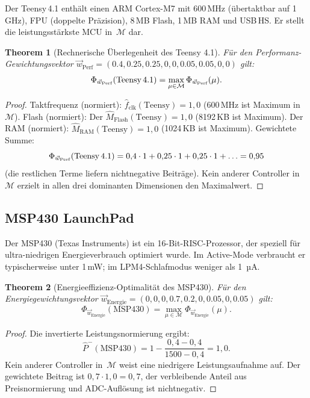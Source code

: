 ﻿\documentclass[12pt, a4paper]{article}
\theoremstyle{plain}
\newtheorem{theorem}{Theorem}[section]
\theoremstyle{definition}
\theoremstyle{remark}
\begin{document}
Der Teensy\,4.1 enthält einen ARM Cortex-M7 mit 600\,MHz (übertaktbar auf
1\,GHz), FPU (doppelte Präzision), 8\,MB Flash, 1\,MB RAM und USB\,HS.
Er stellt die leistungsstärkste MCU in~$\mathcal{M}$ dar.

\begin{theorem}[Rechnerische Überlegenheit des Teensy 4.1]
\label{thm:teensy_superior}
  Für den Performanz-Ge\-wichtungsvektor
  $\vec{w}_\text{Perf} = (0.4, 0.25, 0.25, 0, 0, 0.05, 0.05, 0, 0)$
  gilt:
  \[
    \Phi_{\vec{w}_\text{Perf}}(\text{Teensy\,4.1}) =
    \max_{\mu \in \mathcal{M}} \Phi_{\vec{w}_\text{Perf}}(\mu).
  \]
\end{theorem}

\begin{proof}
  Taktfrequenz (normiert): $\hat{f}_\text{clk}(\text{Teensy}) = 1{,}0$
  (600\,MHz ist Maximum in~$\mathcal{M}$).
  Flash (normiert): Der $\hat{M}_\text{Flash}(\text{Teensy}) = 1{,}0$
  (8192\,KB ist Maximum).
  Der RAM (normiert): $\hat{M}_\text{RAM}(\text{Teensy}) = 1{,}0$
  (1024\,KB ist Maximum).
  Gewichtete Summe:
  \[
    \Phi_{\vec{w}_\text{Perf}}(\text{Teensy\,4.1}) =
    0{,}4 \cdot 1 + 0{,}25 \cdot 1 + 0{,}25 \cdot 1 + \ldots = 0{,}95
  \]
  (die restlichen Terme liefern nichtnegative Beiträge).
  Kein anderer Controller in~$\mathcal{M}$ erzielt in allen drei
  dominanten Dimensionen den Maximalwert.
\end{proof}

\subsection{MSP430 LaunchPad}

Der MSP430 (Texas Instruments) ist ein 16-Bit-RISC-Prozessor, der speziell für
ultra-niedrigen Energieverbrauch optimiert wurde.
Im Active-Mode verbraucht er typischerweise unter 1\,mW; im
LPM4-Schlafmodus weniger als 1\, µA.

\begin{theorem}[Energieeffizienz-Optimalität des MSP430]
\label{thm:msp430_energie}
  Für den Energiegewichtungsvektor
  $\vec{w}_\text{Energie} = (0, 0, 0, 0.7, 0.2, 0, 0.05, 0, 0.05)$
  gilt:
  \[
    \Phi_{\vec{w}_\text{Energie}}(\text{MSP430}) =
    \max_{\mu \in \mathcal{M}} \Phi_{\vec{w}_\text{Energie}}(\mu).
  \]
\end{theorem}

\begin{proof}
  Die invertierte Leistungsnormierung ergibt:
  \[
    \hat{P}^{-}(\text{MSP430}) = 1 - \frac{0{,}4 - 0{,}4}{1500 - 0{,}4} = 1{,}0.
  \]
  Kein anderer Controller in~$\mathcal{M}$ weist eine niedrigere
  Leistungsaufnahme auf.
  Der gewichtete Beitrag ist $0{,}7 \cdot 1{,}0 = 0{,}7$, der verbleibende
  Anteil aus Preisnormierung und ADC-Auflösung ist nichtnegativ.
 
\end{proof}
\end{document}
